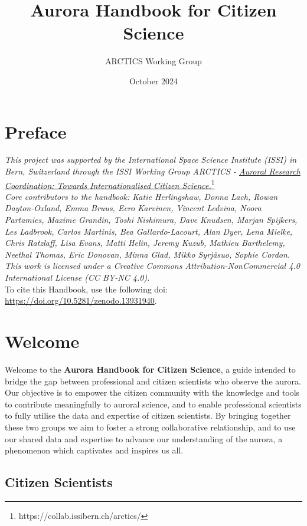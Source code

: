 \documentclass{article}
\title{Aurora Handbook for Citizen Science}
\author{ARCTICS Working Group}
\date{October 2024}
\newcommand{\contributed}[1]{%
    \par\noindent
    \begingroup
    \setlength{\leftskip}{1em}%
    \itshape
    Contributors: #1
    \par
    \endgroup
    \vspace{0.5em}
}
\begin{document}
\maketitle
\tableofcontents
\newpage

\section{Preface}
\textit{This project was supported by the International Space Science Institute (ISSI) in Bern, Switzerland through the ISSI Working Group ARCTICS - \href{https://collab.issibern.ch/arctics/}{Auroral Research Coordination: Towards Internationalised Citizen Science.}}\footnote{https://collab.issibern.ch/arctics/}\\
\textit{Core contributors to the handbook: Katie Herlingshaw, Donna Lach, Rowan Dayton-Oxland, Emma Bruus, Eero Karvinen, Vincent Ledvina, Noora Partamies, Maxime Grandin, Toshi Nishimura, Dave Knudsen, Marjan Spijkers, Les Ladbrook, Carlos Martinis, Bea Gallardo-Lacourt, Alan Dyer, Lena Mielke, Chris Ratzlaff, Lisa Evans, Matti Helin, Jeremy Kuzub, Mathieu Barthelemy, Neethal Thomas, Eric Donovan, Minna Glad, Mikko Syrjäsuo, Sophie Cordon.}\\
\textit{This work is licensed under a Creative Commons Attribution-NonCommercial 4.0 International License (CC BY-NC 4.0).}\\
To cite this Handbook, use the following doi: \url{https://doi.org/10.5281/zenodo.13931940}.

 
\section{Welcome}
Welcome to the {\bf Aurora Handbook for Citizen Science}, a guide intended to bridge the gap between professional and citizen scientists who observe the aurora. Our objective is to empower the citizen community with the knowledge and tools to contribute meaningfully to auroral science, and to enable professional scientists to fully utilise the data and expertise of citizen scientists. By bringing together these two groups we aim to foster a strong collaborative relationship, and to use our shared data and expertise to advance our understanding of the aurora, a phenomenon which captivates and inspires us all. 

\subsection{Citizen Scientists}
\end{document}
